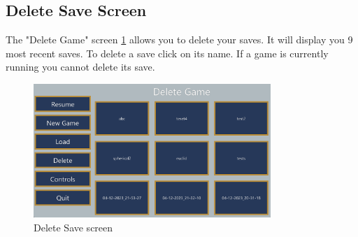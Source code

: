 \subsection{Delete Save Screen}
The "Delete Game" screen \ref{fig:delete_save} allows you to delete your saves.
It will display you 9 most recent saves.
To delete a save click on its name.
If a game is currently running you cannot delete its save.

\begin{figure}[H]
    \centering
    \includegraphics[width=0.8\textwidth]{sections/user_manual/resources/delete-game.png}
    \caption{Delete Save screen}
    \label{fig:delete_save}
\end{figure}